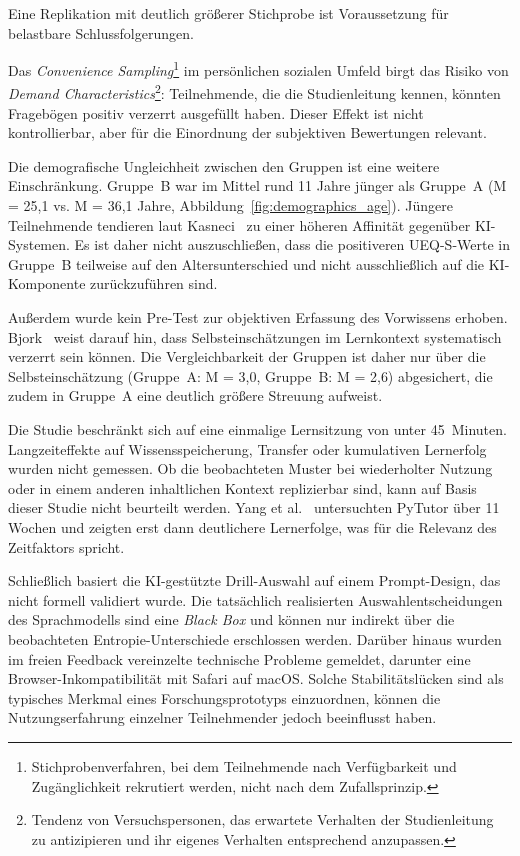 Eine Replikation mit deutlich größerer Stichprobe ist Voraussetzung für belastbare Schlussfolgerungen.

Das \textit{Convenience Sampling}\footnote{Stichprobenverfahren, bei dem Teilnehmende nach Verfügbarkeit und Zugänglichkeit rekrutiert werden, nicht nach dem Zufallsprinzip.} im persönlichen sozialen Umfeld birgt das Risiko von \textit{Demand Characteristics}\footnote{Tendenz von Versuchspersonen, das erwartete Verhalten der Studienleitung zu antizipieren und ihr eigenes Verhalten entsprechend anzupassen.}: Teilnehmende, die die Studienleitung kennen, könnten Fragebögen positiv verzerrt ausgefüllt haben. Dieser Effekt ist nicht kontrollierbar, aber für die Einordnung der subjektiven Bewertungen relevant.

Die demografische Ungleichheit zwischen den Gruppen ist eine weitere Einschränkung. Gruppe~B war im Mittel rund 11 Jahre jünger als Gruppe~A (M = 25{,}1 vs. M = 36{,}1 Jahre, Abbildung~\ref{fig:demographics_age}). Jüngere Teilnehmende tendieren laut Kasneci~\cite{kasneci2023} zu einer höheren Affinität gegenüber KI-Syste\-men. Es ist daher nicht auszuschließen, dass die positiveren UEQ-S-Werte in Gruppe~B teilweise auf den Altersunterschied und nicht ausschließlich auf die KI-Komponente zurückzuführen sind.

Außerdem wurde kein Pre-Test zur objektiven Erfassung des Vorwissens erhoben. Bjork~\cite{bjork2013} weist darauf hin, dass Selbsteinschätzungen im Lernkontext systematisch verzerrt sein können. Die Vergleichbarkeit der Gruppen ist daher nur über die Selbsteinschätzung (Gruppe~A: M = 3{,}0, Gruppe~B: M = 2{,}6) abgesichert, die zudem in Gruppe~A eine deutlich größere Streuung aufweist.

Die Studie beschränkt sich auf eine einmalige Lernsitzung von unter 45~Minuten. Langzeiteffekte auf Wissensspeicherung, Transfer oder kumulativen Lernerfolg wurden nicht gemessen. Ob die beobachteten Muster bei wiederholter Nutzung oder in einem anderen inhaltlichen Kontext replizierbar sind, kann auf Basis dieser Studie nicht beurteilt werden. Yang et al.~\cite{yang2024pytutor} untersuchten PyTutor über 11 Wochen und zeigten erst dann deutlichere Lernerfolge, was für die Relevanz des Zeitfaktors spricht.

Schließlich basiert die KI-gestützte Drill-Auswahl auf einem Prompt-Design, das nicht formell validiert wurde. Die tatsächlich realisierten Auswahlentscheidungen des Sprachmodells sind eine \textit{Black Box} und können nur indirekt über die beobachteten Entropie-Unterschiede erschlossen werden. Darüber hinaus wurden im freien Feedback vereinzelte technische Probleme gemeldet, darunter eine Browser-Inkompatibilität mit Safari auf macOS. Solche Stabilitätslücken sind als typisches Merkmal eines Forschungsprototyps einzuordnen, können die Nutzungserfahrung einzelner Teilnehmender jedoch beeinflusst haben.

